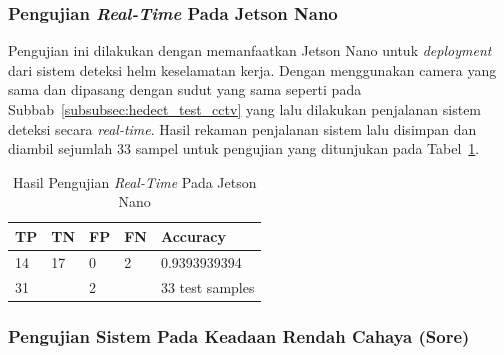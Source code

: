 \subsubsection{Pengujian \emph{Real-Time} Pada Jetson Nano}
\label{subsubsec:hedect_test_cctv_jetsonanno}


\par Pengujian ini dilakukan dengan memanfaatkan Jetson Nano untuk \emph{deployment} dari sistem deteksi helm keselamatan kerja. Dengan menggunakan camera yang sama dan dipasang dengan sudut yang sama seperti pada Subbab~\ref{subsubsec:hedect_test_cctv} yang lalu dilakukan penjalanan sistem deteksi secara \emph{real-time}. Hasil rekaman penjalanan sistem lalu disimpan dan diambil sejumlah 33 sampel untuk pengujian yang ditunjukan pada Tabel~\ref{tb:systest_jetsonnano}.

\begin{table}
  \centering
  \caption{Hasil Pengujian \emph{Real-Time} Pada Jetson Nano}
  \label{tb:systest_jetsonnano}
  \begin{tabular}{|l|l|l|l|l|} 
  \hline
  TP & TN                    & FP & FN                & Accuracy         \\ 
  \hline
  14 & 17                    & 0  & 2                 & 0.9393939394     \\ 
  \hline
  \multicolumn{2}{|l|}{31}   & \multicolumn{2}{l|}{2} & 33 test samples  \\
  \hline
  \end{tabular}
\end{table}

\subsubsection{Pengujian Sistem Pada Keadaan Rendah Cahaya (Sore)}
\label{subsubsec:hedect_test_lowillum_dusk}


